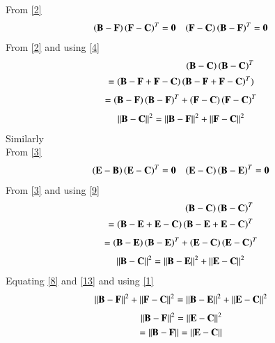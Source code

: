 \documentclass[journal,12pt,twocolumn]{IEEEtran}
\begin{document}
From \eqref{2}
\begin{align}
    \left(\mathbf{B}-\mathbf{F}\right)\left(\mathbf{F}-\mathbf{C}\right)^T=\mathbf{0} && \left(\mathbf{F}-\mathbf{C}\right)\left(\mathbf{B}-\mathbf{F}\right)^T=\mathbf{0}\label{4}
\end{align}
From \eqref{2} and using \eqref{4} 
\begin{align}
    \left(\mathbf{B}-\mathbf{C}\right)\left(\mathbf{B}-\mathbf{C}\right)^T\\
    =\left(\mathbf{B}-\mathbf{F}+\mathbf{F}-\mathbf{C}\right)\left(\mathbf{B}-\mathbf{F}+\mathbf{F}-\mathbf{C}\right)^T)
    \end{align}
    \begin{align}
      =\left(\mathbf{B}-\mathbf{F}\right)\left(\mathbf{B}-\mathbf{F}\right)^T+\left(\mathbf{F}-\mathbf{C}\right)\left(\mathbf{F}-\mathbf{C}\right)^T 
    \end{align}
\begin{align}
   \left\lVert\mathbf{B}-\mathbf{C}\right\rVert^2=\left\lVert\mathbf{B}-\mathbf{F}\right\rVert^2+\left\lVert\mathbf{F}-\mathbf{C}\right\rVert^2\label{8} 
    \end{align}
    Similarly\\
    From \eqref{3}
    \begin{align}
        \left(\mathbf{E}-\mathbf{B}\right)\left(\mathbf{E}-\mathbf{C}\right)^T=\mathbf{0} && \left(\mathbf{E}-\mathbf{C}\right)\left(\mathbf{B}-\mathbf{E}\right)^T=\mathbf{0}\label{9}
        \end{align}
From  \eqref{3} and using \eqref{9}  
\begin{align}
    \left(\mathbf{B}-\mathbf{C}\right)\left(\mathbf{B}-\mathbf{C}\right)^T\\
    =\left(\mathbf{B}-\mathbf{E}+\mathbf{E}-\mathbf{C}\right)\left(\mathbf{B}-\mathbf{E}+\mathbf{E}-\mathbf{C}\right)^T
    \end{align}
    \begin{align}
      =\left(\mathbf{B}-\mathbf{E}\right)\left(\mathbf{B}-\mathbf{E}\right)^T+\left(\mathbf{E}-\mathbf{C}\right)\left(\mathbf{E}-\mathbf{C}\right)^T 
    \end{align}
\begin{align}
   \left\lVert\mathbf{B}-\mathbf{C}\right\rVert^2=\left\lVert\mathbf{B}-\mathbf{E}\right\rVert^2+\left\lVert\mathbf{E}-\mathbf{C}\right\rVert^2\label{13}
    \end{align}        
    Equating \eqref{8} and \eqref{13} and using \eqref{1}
    \begin{align}
      \left\lVert\mathbf{B}-\mathbf{F}\right\rVert^2+\left\lVert\mathbf{F}-\mathbf{C}\right\rVert^2 = \left\lVert\mathbf{B}-\mathbf{E}\right\rVert^2+\left\lVert\mathbf{E}-\mathbf{C}\right\rVert^2  
    \end{align}
    \begin{align}
       \left\lVert\mathbf{B}-\mathbf{F}\right\rVert^2=\left\lVert\mathbf{E}-\mathbf{C}\right\rVert^2\\
       =\left\lVert\mathbf{B}-\mathbf{F}\right\rVert=\left\lVert\mathbf{E}-\mathbf{C}\right\rVert\label{16}
    \end{align}
\end{document}
